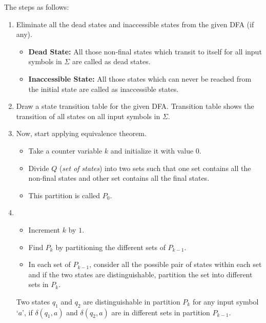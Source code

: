 \begin{multicols}{2}
\setlength{\columnsep}{1.5cm}
\setlength{\columnseprule}{0.2pt}

The steps as follows:
\begin{enumerate}
  \item Eliminate all the dead states and inaccessible states from the given DFA (if any).
    \begin{itemize}
      \item \textbf{Dead State:} All those non-final states which transit to itself for all input symbols in $\Sigma$ are called as dead states.
      \item \textbf{Inaccessible State:} All those states which can never be reached from the initial state are called as inaccessible states.
    \end{itemize}
  
  \item Draw a state transition table for the given DFA. Transition table shows the transition of all states on all input symbols in $\Sigma$.
  
  \item Now, start applying equivalence theorem.
    \begin{itemize}
      \item Take a counter variable $k$ and initialize it with value 0.
      \item Divide $Q$ (\textit{set of states}) into two sets such that one set contains all the non-final states and other set contains all the final states.
      \item This partition is called $P_0$.
    \end{itemize}
  
  \item 
    \begin{itemize}
      \item Increment $k$ by $1$.
      \item Find $P_k$ by partitioning the different sets of $P_{k - 1}$.
      \item In each set of $P_{k - 1}$, consider all the possible pair of states within each set and if the two states are distinguishable, partition the set into different sets in $P_k$.
    \end{itemize}
  
    Two states $q_1$ and $q_2$ are distinguishable in partition $P_k$ for any input symbol `$a$', if $\delta(q_1, a)$ and $\delta(q_2, a)$ are in different sets in partition $P_{k-1}$.
  

\end{enumerate}
\end{multicols}
